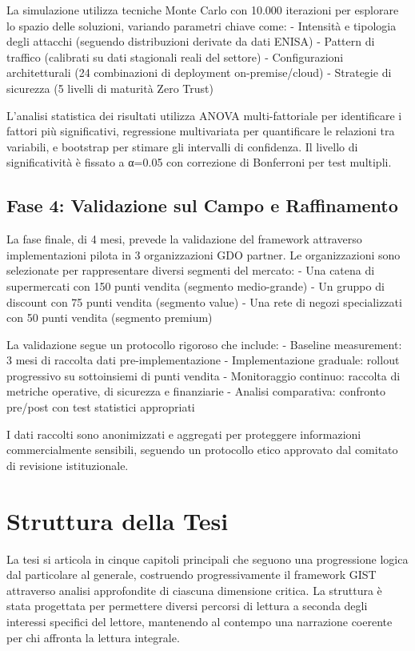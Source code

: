 La simulazione utilizza tecniche Monte Carlo con 10.000 iterazioni per esplorare lo spazio delle soluzioni, variando parametri chiave come:
- Intensità e tipologia degli attacchi (seguendo distribuzioni derivate da dati ENISA)
- Pattern di traffico (calibrati su dati stagionali reali del settore)
- Configurazioni architetturali (24 combinazioni di deployment on-premise/cloud)
- Strategie di sicurezza (5 livelli di maturità Zero Trust)

L'analisi statistica dei risultati utilizza ANOVA multi-fattoriale per identificare i fattori più significativi, regressione multivariata per quantificare le relazioni tra variabili, e bootstrap per stimare gli intervalli di confidenza. Il livello di significatività è fissato a α=0.05 con correzione di Bonferroni per test multipli.

\subsection{Fase 4: Validazione sul Campo e Raffinamento}

La fase finale, di 4 mesi, prevede la validazione del framework attraverso implementazioni pilota in 3 organizzazioni GDO partner. Le organizzazioni sono selezionate per rappresentare diversi segmenti del mercato:
- Una catena di supermercati con 150 punti vendita (segmento medio-grande)
- Un gruppo di discount con 75 punti vendita (segmento value)
- Una rete di negozi specializzati con 50 punti vendita (segmento premium)

La validazione segue un protocollo rigoroso che include:
- Baseline measurement: 3 mesi di raccolta dati pre-implementazione
- Implementazione graduale: rollout progressivo su sottoinsiemi di punti vendita
- Monitoraggio continuo: raccolta di metriche operative, di sicurezza e finanziarie
- Analisi comparativa: confronto pre/post con test statistici appropriati

I dati raccolti sono anonimizzati e aggregati per proteggere informazioni commercialmente sensibili, seguendo un protocollo etico approvato dal comitato di revisione istituzionale.

\section{Struttura della Tesi}

La tesi si articola in cinque capitoli principali che seguono una progressione logica dal particolare al generale, costruendo progressivamente il framework GIST attraverso analisi approfondite di ciascuna dimensione critica. La struttura è stata progettata per permettere diversi percorsi di lettura a seconda degli interessi specifici del lettore, mantenendo al contempo una narrazione coerente per chi affronta la lettura integrale.

